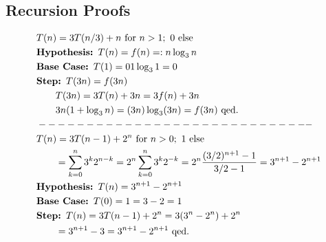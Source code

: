 \documentclass[9pt,landscape,a4paper, table]{extarticle}
\begin{document}
\begin{multicols*}{3}
\subsection{Recursion Proofs}
\vspace{-0.2cm}
{\small
\begin{align*}
    &T(n) = 3T(n/3) + n\ \text{for}\ n > 1;\ 0\ \text{else}\\
    &\text{\textbf{Hypothesis: }} T(n) = f(n) =: n\log_3 n\\
    &\text{\textbf{Base Case: }} T(1) =0 1\log_3 1 = 0\\
    &\text{\textbf{Step: }} T(3n) = f(3n)\\
    &\qquad T(3n) = 3T(n) + 3n = 3f(n) + 3n\\
    &\qquad 3n(1+\log_3n) = (3n)\log_3(3n) = f(3n)\ \text{qed.}\\
    &-----------------------------\\
    &T(n) = 3T(n-1) + 2^n\ \text{for}\ n > 0;\ 1\ \text{else}\\
    &\qquad =\sum_{k=0}^n 3^k2^{n-k} = 2^n\sum_{k=0}^n 3^k2^{-k} = 2^n\frac{(3/2)^{n+1}-1}{3/2-1} = 3^{n+1}-2^{n+1}\\
    &\text{\textbf{Hypothesis: }} T(n) = 3^{n+1}-2^{n+1}\\
    &\text{\textbf{Base Case: }} T(0) =1 =3-2 =1\\
    &\text{\textbf{Step: }} T(n) = 3T(n-1)+2^n =3(3^n-2^n)+2^n\\
    &\qquad = 3^{n+1}-3 = 3^{n+1}-2^{n+1} \ \text{qed.}
\end{align*}
}


\end{multicols*}
\end{document}
